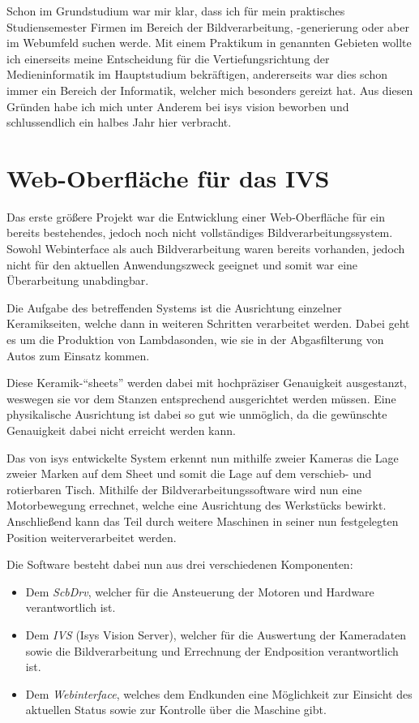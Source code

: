 \documentclass[xcolor=dvipsnames,11pt,paper=a4paper]{report}
\begin{document}
Schon im Grundstudium war mir klar, dass ich für mein praktisches Studiensemester
Firmen im Bereich der Bildverarbeitung, -generierung oder aber im Webumfeld suchen
werde. Mit einem Praktikum in genannten Gebieten wollte ich einerseits meine Entscheidung
für die Vertiefungsrichtung der Medieninformatik im Hauptstudium bekräftigen, andererseits
war dies schon immer ein Bereich der Informatik, welcher mich besonders gereizt
hat. Aus diesen Gründen habe ich mich unter Anderem bei isys vision beworben und
schlussendlich ein halbes Jahr hier verbracht.




\chapter{Web-Oberfläche für das IVS}

Das erste größere Projekt war die Entwicklung einer Web-Oberfläche für ein bereits
bestehendes, jedoch noch nicht vollständiges Bildverarbeitungssystem. Sowohl Webinterface
als auch Bildverarbeitung waren bereits vorhanden, jedoch nicht für den aktuellen
Anwendungszweck geeignet und somit war eine Überarbeitung unabdingbar.

Die Aufgabe des betreffenden Systems ist die Ausrichtung einzelner Keramikseiten,
welche dann in weiteren Schritten verarbeitet werden. Dabei geht es um die Produktion
von Lambdasonden, wie sie in der Abgasfilterung von Autos zum Einsatz kommen.

Diese Keramik-``sheets'' werden dabei mit hochpräziser Genauigkeit ausgestanzt,
weswegen sie vor dem Stanzen entsprechend ausgerichtet werden müssen. Eine physikalische
Ausrichtung ist dabei so gut wie unmöglich, da die gewünschte Genauigkeit dabei
nicht erreicht werden kann.

Das von isys entwickelte System erkennt nun mithilfe
zweier Kameras die Lage zweier Marken auf dem Sheet und somit die Lage auf dem verschieb-
und rotierbaren Tisch. Mithilfe der Bildverarbeitungssoftware wird nun eine Motorbewegung
errechnet, welche eine Ausrichtung des Werkstücks bewirkt. Anschließend kann das
Teil durch weitere Maschinen in seiner nun festgelegten Position weiterverarbeitet
werden.

Die Software besteht dabei nun aus drei verschiedenen Komponenten:
\begin{itemize}
	\item Dem \textit{ScbDrv}, welcher für die Ansteuerung der Motoren und Hardware
	verantwortlich ist.
	\item Dem \textit{IVS} (Isys Vision Server), welcher für die Auswertung der Kameradaten
	sowie die Bildverarbeitung und Errechnung der Endposition verantwortlich ist.
	\item Dem \textit{Webinterface}, welches dem Endkunden eine Möglichkeit zur Einsicht
	des aktuellen Status sowie zur Kontrolle über die Maschine gibt.
\end{itemize}
\end{document}
